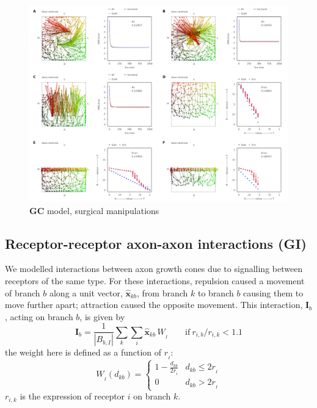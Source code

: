 \documentclass[11pt, a4paper]{article}
\begin{document}
\begin{figure}
\includegraphics[width=\linewidth]{./images/fig_GC_surgical.png}
\caption{$\mathbf{GC}$ model, surgical manipulations}
\label{f:GC}
\end{figure}

\subsection*{Receptor-receptor axon-axon interactions (GI)}

We modelled interactions between axon growth cones due to signalling between
receptors of the same type. For these interactions, repulsion caused a
movement of branch $b$ along a unit vector, $\hat{\mathbf{x}}_{kb}$, from
branch $k$ to branch $b$ causing them to move further apart; attraction caused
the opposite movement. This interaction, $\mathbf{I}_b$, acting on branch $b$,
is given by
%
\begin{equation}
\mathbf{I}_b
= \frac{1}{|B_{b,I}|} \sum_k \sum_i \hat{\mathbf{x}}_{kb}\,W_{\!_I} \qquad \mathrm{if}~r_{i,b}
/ r_{i,k} < 1.1
\end{equation}
%
the weight here is defined as a function of $r_{\!_I}$:
%
\begin{equation}
W_{\!_I}(d_{kb}) = \begin{cases}
      1 - \frac{d_{kb}}{2r_{\!_I}}   & d_{kb} \leq 2r_{\!_I} \\
     0 & d_{kb} > 2r_{\!_I}
     \end{cases}
\end{equation}
$r_{i,k}$ is the expression of receptor $i$ on branch $k$.
\end{document}
